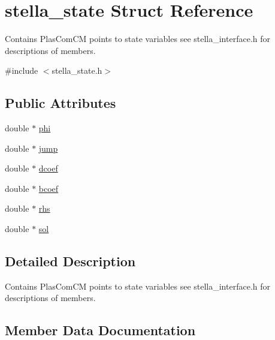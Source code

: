 \hypertarget{structstella__state}{}\section{stella\+\_\+state Struct Reference}
\label{structstella__state}


Contains Plas\+Com\+CM points to state variables see stella\+\_\+interface.\+h for descriptions of members.  




{\ttfamily \#include $<$stella\+\_\+state.\+h$>$}

\subsection*{Public Attributes}
\begin{DoxyCompactItemize}
\item 
double $\ast$ \mbox{\hyperlink{structstella__state_a4f992ca5d0ac37d2f314d642667a292c}{phi}}
\item 
double $\ast$ \mbox{\hyperlink{structstella__state_a835f723e4ea9b52295079c9b86d5f15d}{jump}}
\item 
double $\ast$ \mbox{\hyperlink{structstella__state_ac52d39e3f4675d9abaf72800aa36af2c}{dcoef}}
\item 
double $\ast$ \mbox{\hyperlink{structstella__state_af9015a59753fb223df5d20151fd04446}{bcoef}}
\item 
double $\ast$ \mbox{\hyperlink{structstella__state_a11eb2dbbba860f01556c0f4ed067fa1b}{rhs}}
\item 
double $\ast$ \mbox{\hyperlink{structstella__state_a44ba82bd7241e84bd5c9b3b179b19bb8}{sol}}
\end{DoxyCompactItemize}


\subsection{Detailed Description}
Contains Plas\+Com\+CM points to state variables see stella\+\_\+interface.\+h for descriptions of members. 

\subsection{Member Data Documentation}
\mbox{\label{structstella__state_af9015a59753fb223df5d20151fd04446}} 
